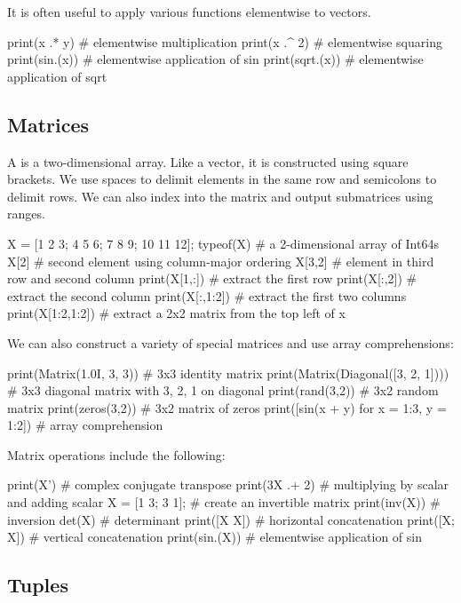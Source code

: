 It is often useful to apply various functions elementwise to vectors.
\begin{juliaconsole}
print(x .* y)   # elementwise multiplication
print(x .^ 2)   # elementwise squaring
print(sin.(x))  # elementwise application of sin
print(sqrt.(x)) # elementwise application of sqrt
\end{juliaconsole}

\subsection{Matrices}

A  is a two-dimensional array. Like a vector, it is constructed using square brackets. We use spaces to delimit elements in the same row and semicolons to delimit rows. We can also index into the matrix and output submatrices using ranges.
\begin{juliaconsole}
X = [1 2 3; 4 5 6; 7 8 9; 10 11 12];
typeof(X)         # a 2-dimensional array of Int64s
X[2]              # second element using column-major ordering
X[3,2]            # element in third row and second column
print(X[1,:])     # extract the first row
print(X[:,2])     # extract the second column
print(X[:,1:2])   # extract the first two columns
print(X[1:2,1:2]) # extract a 2x2 matrix from the top left of x
\end{juliaconsole}

We can also construct a variety of special matrices and use array comprehensions:
\begin{juliaconsole}
print(Matrix(1.0I, 3, 3))          # 3x3 identity matrix
print(Matrix(Diagonal([3, 2, 1]))) # 3x3 diagonal matrix with 3, 2, 1 on diagonal
print(rand(3,2))                   # 3x2 random matrix
print(zeros(3,2))                  # 3x2 matrix of zeros
print([sin(x + y) for x = 1:3, y = 1:2]) # array comprehension
\end{juliaconsole}

Matrix operations include the following:
\begin{juliaconsole}
print(X')       # complex conjugate transpose
print(3X .+ 2)  # multiplying by scalar and adding scalar
X = [1 3; 3 1]; # create an invertible matrix
print(inv(X))   # inversion
det(X)          # determinant
print([X X])    # horizontal concatenation
print([X; X])   # vertical concatenation
print(sin.(X))  # elementwise application of sin
\end{juliaconsole}

\subsection{Tuples}

